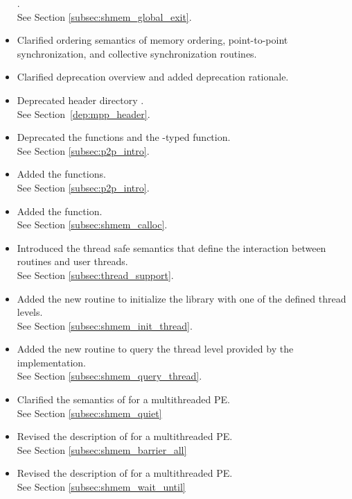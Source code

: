 \begin{itemize}
.
\\ See Section \ref{subsec:shmem_global_exit}.
%
\item Clarified ordering semantics of memory ordering, point-to-point synchronization, and collective
synchronization routines.
%
\item Clarified deprecation overview and added deprecation rationale.
%
%
\item Deprecated header directory .
\\ See Section~\ref{dep:mpp_header}.
%
\item Deprecated the  functions and the -typed \CorCpp {} function.
\\ See Section \ref{subsec:p2p_intro}.
%
\item Added the  functions.
\\ See Section \ref{subsec:p2p_intro}.
%
\item Added the  function.
\\ See Section \ref{subsec:shmem_calloc}.
%
\item Introduced the thread safe semantics that define the interaction between
    \openshmem routines and user threads.
\\See Section \ref{subsec:thread_support}.
%
\item Added the new routine  to initialize the
    \openshmem library with one of the defined thread levels.
\\See Section \ref{subsec:shmem_init_thread}.
%
\item Added the new routine  to query the thread
    level provided by the \openshmem implementation.
\\See Section \ref{subsec:shmem_query_thread}.
%
\item Clarified the semantics of  for a multithreaded
    \openshmem \ac{PE}.
\\See Section \ref{subsec:shmem_quiet}
%
\item Revised the description of  for a multithreaded
    \openshmem \ac{PE}.
\\See Section \ref{subsec:shmem_barrier_all}
%
\item Revised the description of  for a multithreaded
    \openshmem \ac{PE}.
\\See Section \ref{subsec:shmem_wait_until}

\end{itemize}
